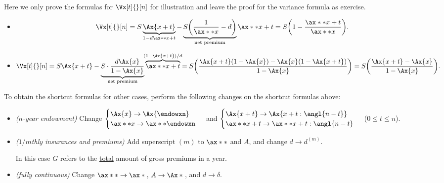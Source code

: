 \begin{enumerate}
\begin{pf}
Here we only prove the formulas for \(\Vx[t]{}[n]\) for illustration and leave
the proof for the variance formula as exercise.
\begin{itemize}
\item \[
\Vx[t]{}[n]=S\underbrace{\Ax{x+t}}_{\mathclap{1-d\ax**{x+t}}}
-\underbrace{S\qty(\frac{1}{\ax**{x}}-d)}_{\text{net premium}}\ax**{x+t}
=S\qty(1-\frac{\ax**{x+t}}{\ax**{x}}).
\]
\item
\[
\Vx[t]{}[n]=S\Ax{x+t}-\underbrace{S\cdot \frac{d\Ax{x}}{1-\Ax{x}}}_{\text{net premium}}
\overbrace{\ax**{x+t}}^{\mathclap{(1-\Ax{x+t})/d}}
=S\qty(\frac{\Ax{x+t}(1-\Ax{x})-\Ax{x}(1-\Ax{x+t})}{1-\Ax{x}})
=S\qty(\frac{\Ax{x+t}-\Ax{x}}{1-\Ax{x}}).
\]
\end{itemize}
\end{pf}

To obtain the shortcut formulas for other cases, perform the following changes
on the shortcut formulas above:
\begin{itemize}
\item \emph{(\(n\)-year endowment)} Change \(
\begin{cases}
\Ax{x}\to\Ax{\endowxn} \\
\ax**{x}\to\ax**{\endowxn}
\end{cases}
\) and
\(
\begin{cases}
\Ax{x+t}\to\Ax{x+t:\angl{n-t}} \\
\ax**{x+t}\to\ax**{x+t:\angl{n-t}}
\end{cases}
\) (\(0\le t\le n\)).
\item \emph{(\(1/m\)thly insurances and premiums)} Add superscript \((m)\) to
\(\ax**{}\) and \(A\), and change \(d\to d^{(m)}\).

\begin{note}
In this case \(G\) refers to the \underline{total} amount of gross premiums in
a year.
\end{note}
\item \emph{(fully continuous)} Change \(\ax**{}\to\ax*{}\), \(A\to\Ax*{}\),
and \(d\to\delta\).
\end{itemize}
\end{enumerate}
